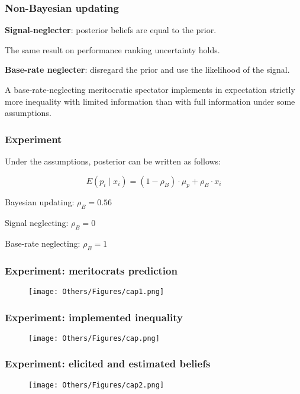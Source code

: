 \documentclass[usenames,dvipsnames,aspectratio=169,11pt, envcountsect]{beamer}
\begin{document}
\begin{frame}\frametitle{Non-Bayesian updating}

	\textbf{Signal-neglecter}: posterior beliefs are equal to the prior.

	\vfill

	The same result on performance ranking uncertainty holds.

	\vfill

	\textbf{Base-rate neglecter}: disregard the prior and use the likelihood of the signal.

	\begin{prop}
		A base-rate-neglecting meritocratic spectator implements in
		expectation strictly more inequality with limited information than with full
		information under some assumptions.
	\end{prop}

\end{frame}

\begin{frame}\frametitle{Experiment}

	Under the assumptions, posterior can be written as follows:

	\[ E \left( p_i \mid x_i \right)= \left( 1-\rho_B \right) \cdot \mu_p+\rho_B \cdot x_i
	\]

	\vfill

	Bayesian updating: \(\rho_B = 0.56\)

	\vfill

	Signal neglecting: \(\rho_B = 0\)

	\vfill

	Base-rate neglecting: \(\rho_B = 1\)
\end{frame}

\begin{frame}\frametitle{Experiment: meritocrats prediction}
	\begin{figure}
		\texttt{[image: Others/Figures/cap1.png]}
	\end{figure}
\end{frame}

\begin{frame}\frametitle{Experiment: implemented inequality}
	\begin{figure}
		\texttt{[image: Others/Figures/cap.png]}
	\end{figure}
\end{frame}


\begin{frame}\frametitle{Experiment: elicited and estimated beliefs}
	\begin{figure}
		\texttt{[image: Others/Figures/cap2.png]}
	\end{figure}
\end{frame}
\end{document}
